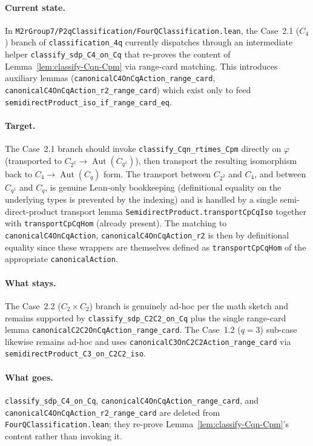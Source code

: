 \paragraph{Current state.} In
\texttt{M2rGroup7/P2qClassification/FourQClassification.lean}, the Case~2.1
($C_4$) branch of \texttt{classification\_4q} currently dispatches through an
intermediate helper \texttt{classify\_sdp\_C4\_on\_Cq} that re-proves the
content of Lemma~\ref{lem:classify-Cqn-Cpm} via range-card matching. This
introduces auxiliary lemmas
(\texttt{canonicalC4OnCqAction\_range\_card},
\texttt{canonicalC4OnCqAction\_r2\_range\_card}) which exist only to feed
\texttt{semidirectProduct\_iso\_if\_range\_card\_eq}.

\paragraph{Target.} The Case~2.1 branch should invoke
\texttt{classify\_Cqn\_rtimes\_Cpm} directly on $\varphi$ (transported to
$C_{2^2} \to \operatorname{Aut}(C_{q^1})$), then transport the resulting
isomorphism back to $C_4 \to \operatorname{Aut}(C_q)$ form. The transport
between $C_{2^2}$ and $C_4$, and between $C_{q^1}$ and $C_q$, is genuine
Lean-only bookkeeping (definitional equality on the underlying types is
prevented by the indexing) and is handled by a single semi-direct-product
transport lemma \texttt{SemidirectProduct.transportCpCqIso} together with
\texttt{transportCpCqHom} (already present). The matching to
\texttt{canonicalC4OnCqAction}, \texttt{canonicalC4OnCqAction\_r2} is then by
definitional equality since these wrappers are themselves defined as
\texttt{transportCpCqHom} of the appropriate \texttt{canonicalAction}.

\paragraph{What stays.} The Case~2.2 ($C_2 \times C_2$) branch is genuinely
ad-hoc per the math sketch and remains supported by
\texttt{classify\_sdp\_C2C2\_on\_Cq} plus the single range-card lemma
\texttt{canonicalC2C2OnCqAction\_range\_card}. The Case~1.2 ($q = 3$) sub-case
likewise remains ad-hoc and uses \texttt{canonicalC3OnC2C2Action\_range\_card}
via \texttt{semidirectProduct\_C3\_on\_C2C2\_iso}.

\paragraph{What goes.} \texttt{classify\_sdp\_C4\_on\_Cq},
\texttt{canonicalC4OnCqAction\_range\_card}, and
\texttt{canonicalC4OnCqAction\_r2\_range\_card} are deleted from
\texttt{FourQClassification.lean}; they re-prove
Lemma~\ref{lem:classify-Cqn-Cpm}'s content rather than invoking it.







